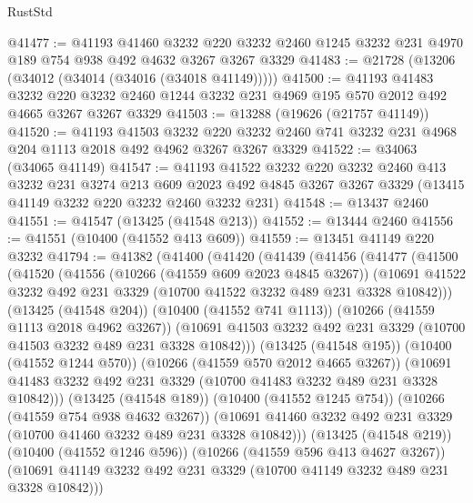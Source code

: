 \begin{lexlean}{RustStd}
\begin{coremodule}
@41477 := @41193
    @41460
    @3232
    @220
    @3232
    @2460
    @1245
    @3232
    @231
    @4970
    @189
    @754
    @938
    @492
    @4632
    @3267
    @3267
    @3329
@41483 := @21728 (@13206 (@34012 (@34014 (@34016 (@34018 @41149)))))
@41500 := @41193
    @41483
    @3232
    @220
    @3232
    @2460
    @1244
    @3232
    @231
    @4969
    @195
    @570
    @2012
    @492
    @4665
    @3267
    @3267
    @3329
@41503 := @13288 (@19626 (@21757 @41149))
@41520 := @41193
    @41503
    @3232
    @220
    @3232
    @2460
    @741
    @3232
    @231
    @4968
    @204
    @1113
    @2018
    @492
    @4962
    @3267
    @3267
    @3329
@41522 := @34063 (@34065 @41149)
@41547 := @41193
    @41522
    @3232
    @220
    @3232
    @2460
    @413
    @3232
    @231
    @3274
    @213
    @609
    @2023
    @492
    @4845
    @3267
    @3267
    @3329
    (@13415 @41149 @3232 @220 @3232 @2460 @3232 @231)
@41548 := @13437 @2460
@41551 := @41547 (@13425 (@41548 @213))
@41552 := @13444 @2460
@41556 := @41551 (@10400 (@41552 @413 @609))
@41559 := @13451 @41149 @220 @3232
@41794 := @41382
    (@41400
      (@41420
        (@41439
          (@41456
            (@41477
              (@41500
                (@41520
                  (@41556
                    (@10266 (@41559 @609 @2023 @4845 @3267))
                    (@10691
                      @41522
                      @3232
                      @492
                      @231
                      @3329
                      (@10700 @41522 @3232 @489 @231 @3328 @10842)))
                  (@13425 (@41548 @204))
                  (@10400 (@41552 @741 @1113))
                  (@10266 (@41559 @1113 @2018 @4962 @3267))
                  (@10691
                    @41503
                    @3232
                    @492
                    @231
                    @3329
                    (@10700 @41503 @3232 @489 @231 @3328 @10842)))
                (@13425 (@41548 @195))
                (@10400 (@41552 @1244 @570))
                (@10266 (@41559 @570 @2012 @4665 @3267))
                (@10691 @41483 @3232 @492 @231 @3329 (@10700 @41483 @3232 @489 @231 @3328 @10842)))
              (@13425 (@41548 @189))
              (@10400 (@41552 @1245 @754))
              (@10266 (@41559 @754 @938 @4632 @3267))
              (@10691 @41460 @3232 @492 @231 @3329 (@10700 @41460 @3232 @489 @231 @3328 @10842)))
            (@13425 (@41548 @219))
            (@10400 (@41552 @1246 @596))
            (@10266 (@41559 @596 @413 @4627 @3267))
            (@10691 @41149 @3232 @492 @231 @3329 (@10700 @41149 @3232 @489 @231 @3328 @10842)))

\end{coremodule}
\end{lexlean}
